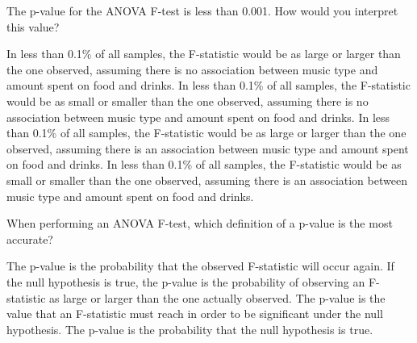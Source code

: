 \documentclass{article}
\begin{document}
\begin{mcquestions}
		\question[follow] The p-value for the ANOVA F-test is less than 0.001. How would you interpret this value?
		\begin{mcanswerslist}
			\answer[correct] In less than 0.1\% of all samples, the F-statistic would be as large or larger than the one observed, assuming there is no association between music type and amount spent on food and drinks.
			\answer In less than 0.1\% of all samples, the F-statistic would be as small or smaller than the one observed, assuming there is no association between music type and amount spent on food and drinks.
			\answer In less than 0.1\% of all samples, the F-statistic would be as large or larger than the one observed, assuming there is an association between music type and amount spent on food and drinks.
			\answer In less than 0.1\% of all samples, the F-statistic would be as small or smaller than the one observed, assuming there is an association between music type and amount spent on food and drinks.
		\end{mcanswerslist}
		
		\question When performing an ANOVA F-test, which definition of a p-value is the most accurate?
		\begin{mcanswerslist}
			\answer The p-value is the probability that the observed F-statistic will occur again.
			\answer[correct] If the null hypothesis is true, the p-value is the probability of observing an F-statistic as large or larger than the one actually observed.
			\answer The p-value is the value that an F-statistic must reach in order to be significant under the null hypothesis.
			\answer The p-value is the probability that the null hypothesis is true.
		\end{mcanswerslist}
		
		
	\end{mcquestions}
\end{document}
